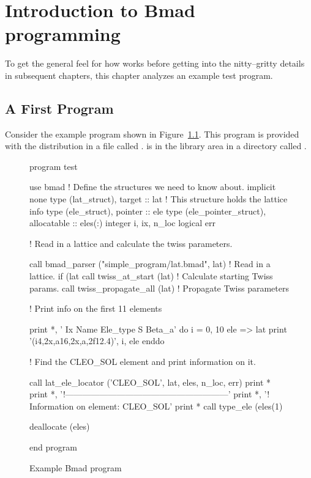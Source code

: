 \chapter{Introduction to Bmad programming}
\label{c:program.info}

To get the general feel for how \bmad works before
getting into the nitty--gritty details in subsequent chapters, this
chapter analyzes an example test program.

\section{A First Program}

Consider the example program shown in Figure~\ref{f:program}.
This program is provided with the \bmad distribution in a file called
.  is in the 
library area in a directory called .



\begin{figure}[htp]
\begin{listing}{1}
program test

  use bmad                 ! Define the structures we need to know about.
  implicit none
  type (lat_struct), target :: lat   ! This structure holds the lattice info
  type (ele_struct), pointer :: ele
  type (ele_pointer_struct), allocatable :: eles(:)
  integer i, ix, n_loc
  logical err

  ! Read in a lattice and calculate the twiss parameters.

  call bmad_parser ("simple_program/lat.bmad", lat) ! Read in a lattice.
  if (lat%
           call twiss_at_start (lat)  ! Calculate starting Twiss params.
  call twiss_propagate_all (lat)      ! Propagate Twiss parameters

  ! Print info on the first 11 elements

  print *, ' Ix  Name              Ele_type                   S      Beta_a'
  do i = 0, 10
    ele => lat%
    print '(i4,2x,a16,2x,a,2f12.4)', i, ele%
  enddo

  ! Find the CLEO_SOL element and print information on it.

  call lat_ele_locator ('CLEO_SOL', lat, eles, n_loc, err)
  print *
  print *, '!---------------------------------------------------------'
  print *, '! Information on element: CLEO_SOL'
  print *
  call type_ele (eles(1)%

  deallocate (eles)

end program
\end{listing}
\caption{Example Bmad program}
\label{f:program}
\end{figure}

